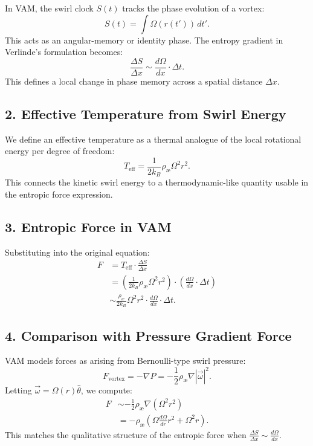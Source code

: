 \documentclass[11pt]{article}
\begin{document}
In VAM, the swirl clock $S(t)$ tracks the phase evolution of a vortex:
\begin{equation}
    S(t) = \int \Omega(r(t'))\, dt'.
\end{equation}
This acts as an angular-memory or identity phase. The entropy gradient in Verlinde's formulation becomes:
\begin{equation}
    \frac{\Delta S}{\Delta x} \sim \frac{d\Omega}{dx} \cdot \Delta t.
\end{equation}
This defines a local change in phase memory across a spatial distance $\Delta x$.

\subsection*{2. Effective Temperature from Swirl Energy}

We define an effective temperature as a thermal analogue of the local rotational energy per degree of freedom:
\begin{equation}
    T_\text{eff} = \frac{1}{2k_B} \rho_\text{\ae} \Omega^2 r^2.
\end{equation}
This connects the kinetic swirl energy to a thermodynamic-like quantity usable in the entropic force expression.

\subsection*{3. Entropic Force in VAM}

Substituting into the original equation:
\begin{align}
    F &= T_\text{eff} \cdot \frac{\Delta S}{\Delta x} \\
      &= \left( \frac{1}{2k_B} \rho_\text{\ae} \Omega^2 r^2 \right) \cdot \left( \frac{d\Omega}{dx} \cdot \Delta t \right) \\
      &\sim \frac{\rho_\text{\ae}}{2k_B} \Omega^2 r^2 \cdot \frac{d\Omega}{dx} \cdot \Delta t.
\end{align}

\subsection*{4. Comparison with Pressure Gradient Force}

VAM models forces as arising from Bernoulli-type swirl pressure:
\begin{equation}
    F_\text{vortex} = -\nabla P = -\frac{1}{2} \rho_\text{\ae} \nabla |\vec{\omega}|^2.
\end{equation}
Letting $\vec{\omega} = \Omega(r) \hat{\theta}$, we compute:
\begin{align}
    F &\sim -\frac{1}{2} \rho_\text{\ae} \nabla (\Omega^2 r^2) \\
      &= -\rho_\text{\ae} \left( \Omega \frac{d\Omega}{dr} r^2 + \Omega^2 r \right).
\end{align}
This matches the qualitative structure of the entropic force when $\frac{\Delta S}{\Delta x} \sim \frac{d\Omega}{dx}$.
\end{document}
